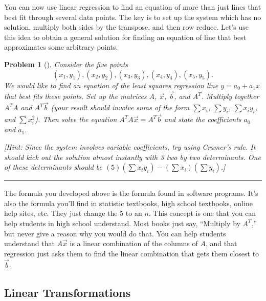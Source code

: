 \documentclass[letterpaper,oneside]{book}%
\theoremstyle{plain}
\theoremstyle{box}
\theoremstyle{problem}
\newtheorem{problemnum}{Problem}[chapter]
\newenvironment{problem}[1][]{\begin{problemnum}[#1]}{\end{problemnum}\nopagebreak\hrule\bigskip}
\begin{document}
You can now use linear regression to find an equation of more than just lines that best fit through several data points. The key is to set up the system which has no solution, multiply both sides by the transpose, and then row reduce. Let's use this idea to obtain a general solution for finding an equation of line that best approximates some arbitrary points. 

\begin{problem}
 Consider the five points 
 $$
 (x_1,y_1),
 (x_2,y_2),
 (x_3,y_3),
 (x_4,y_4),
 (x_5,y_5).
$$
We would like to find an equation of the least squares regression line $y=a_0+a_1x$ that best fits these points. 
Set up the matrices $A$, $\vec x$, $\vec b$, and $A^T$. Multiply together $A^TA$ and $A^T\vec b$ (your result should involve sums of the form $\sum x_i$, $\sum y_i$, $\sum x_iy_i$, and $\sum x_i^2$). Then solve the equation $A^TA\vec x = A^T\vec b$ and state the coefficients $a_0$ and $a_1$. 

[Hint: Since the system involves variable coefficients, try using Cramer's rule. It should kick out the solution almost instantly with 3 two by two determinants. One of these determinants should be $(5)\left(\sum x_iy_i\right) - \left(\sum x_i\right)\left(\sum y_i\right)$.]
\end{problem}

The formula you developed above is the formula found in software programs.  It's also the formula you'll find in statistic textbooks, high school textbooks, online help sites, etc.  They just change the $5$ to an $n$.  This concept is one that you can help students in high school understand.  Most books just say, ``Multiply by $A^T$,'' but never give a reason why you would do that.  You can help students understand that $A\vec x$ is a linear combination of the columns of $A$, and that regression just asks them to find the linear combination that gets them closest to $\vec b$. 

\subsection*{Linear Transformations}
\end{document}
